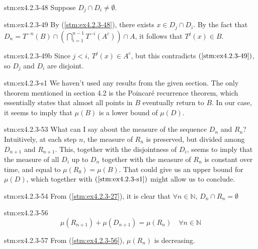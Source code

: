 \begin{statement}{stm:ex4.2.3-48}
Suppose $D_j \cap D_i \ne \emptyset$.
\end{statement}

\begin{statement}{stm:ex4.2.3-49}
By (\ref{stm:ex4.2.3-48}), there exists $x \in D_j \cap D_i$. By the fact that $D_n = T^{-n}(B) \cap \left( \bigcap_{i=1}^{n-1} T^{-i}(A^c) \right) \cap A$, it follows that $T^j(x) \in B$.  
\end{statement}

\begin{statement}{stm:ex4.2.3-49b}
Since $j < i$, $T^j(x) \in A^c$, but this contradicts $(\ref{stm:ex4.2.3-49})$, so $D_j$ and $D_i$ are disjoint.
\end{statement}

\begin{explanation}{stm:ex4.2.3-s1}
We haven't used any results from the given section. The only theorem mentioned in section 4.2 is the Poincaré recurrence theorem, which essentially states that almost all points in $B$ eventually return to $B$. In our case, it seems to imply that $\mu(B)$ is a lower bound of $\mu(D)$. 
\end{explanation}

\begin{explanation}{stm:ex4.2.3-53}
What can I say about the measure of the sequence $D_n$ and $R_n$? Intuitively, at each step $n$, the measure of $R_n$ is preserved, but divided among $D_{n+1}$ and $R_{n+1}$. This, together with the disjointness of $D_i$, seems to imply that the measure of all $D_i$ up to $D_n$ together with the measure of $R_n$ is constant over time, and equal to $\mu(R_0) = \mu(B)$. That could give us an upper bound for $\mu(D)$, which together with $(\ref{stm:ex4.2.3-s1})$ might allow us to conclude.
\end{explanation}

\begin{statement}{stm:ex4.2.3-54}
From (\ref{stm:ex4.2.3-27}), it is clear that $\forall n \in \mathbb{N}$, $D_n \cap R_n = \emptyset$
\end{statement}

\begin{statement}{stm:ex4.2.3-56}
\[
\mu(R_{n+1}) + \mu(D_{n+1}) = \mu(R_n) \quad \forall n \in \mathbb{N}
\]
\end{statement}

\begin{statement}{stm:ex4.2.3-57}
From (\ref{stm:ex4.2.3-56}), $\mu(R_n)$ is decreasing.
\end{statement}

